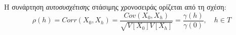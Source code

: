 H συνάρτηση \textit{αυτοσυσχέτισης} στάσιμης χρονοσειράς ορίζεται από τη
σχέση:\\
$$ \rho\left(h \right)=Corr\left( X_0,X_h\right) =\frac{Cov\left( X_0,X_h\right) }{\sqrt{V\left[X_0 \right]V\left[ X_h\right]  }}=\frac{\gamma\left(h \right) }{\gamma\left(0 \right) }, \quad h \in T  $$













\endinput
